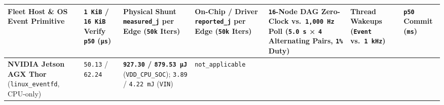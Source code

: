 \documentclass[10pt,letterpaper]{article}
\begin{document}
{\scriptsize\setlength{\tabcolsep}{3.0pt}\renewcommand{\arraystretch}{1.14}
\begin{longtable}[]{@{}
  >{\raggedright\arraybackslash}p{}
  >{\raggedleft\arraybackslash}p{}
  >{\raggedleft\arraybackslash}p{}
  >{\raggedleft\arraybackslash}p{}
  >{\raggedright\arraybackslash}p{}
  >{\raggedleft\arraybackslash}p{}
  >{\raggedleft\arraybackslash}p{}@{}}
\toprule\noalign{}
\begin{minipage}[b]{\linewidth}\raggedright
\textbf{Fleet Host \& OS Event Primitive}
\end{minipage} & \begin{minipage}[b]{\linewidth}\raggedleft
\textbf{\texttt{1\ KiB} / \texttt{16\ KiB} Verify \texttt{p50}
(\texttt{µs})}
\end{minipage} & \begin{minipage}[b]{\linewidth}\raggedleft
\textbf{Physical Shunt \texttt{measured\_\allowbreak{}j} per Edge (\texttt{50k}
Iters)}
\end{minipage} & \begin{minipage}[b]{\linewidth}\raggedleft
\textbf{On-Chip / Driver \texttt{reported\_\allowbreak{}j} per Edge (\texttt{50k}
Iters)}
\end{minipage} & \begin{minipage}[b]{\linewidth}\raggedright
\textbf{\texttt{16}-Node DAG Zero-Clock vs.~\texttt{1,000\ Hz} Poll
(\texttt{5.0\ s} × \texttt{4} Alternating Pairs, \texttt{1\%} Duty)}
\end{minipage} & \begin{minipage}[b]{\linewidth}\raggedleft
\textbf{Thread Wakeups (\texttt{Event} vs.~\texttt{1\ kHz})}
\end{minipage} & \begin{minipage}[b]{\linewidth}\raggedleft
\textbf{\texttt{p50} Commit (\texttt{ms})}
\end{minipage} \\
\midrule\noalign{}
\endhead
\bottomrule\noalign{}
\endlastfoot
\textbf{NVIDIA Jetson AGX Thor} (\texttt{linux\_\allowbreak{}eventfd}, CPU-only) &
\texttt{50.13} / \texttt{62.24} & \textbf{\texttt{927.30} /
\texttt{879.\allowbreak{}53\ µJ}} (\texttt{VDD\_\allowbreak{}CPU\_\allowbreak{}SOC}); \texttt{3.89} /
\texttt{4.22\ mJ} (\texttt{VIN}) & \texttt{not\_\allowbreak{}applicable}

\end{longtable}}
\end{document}
